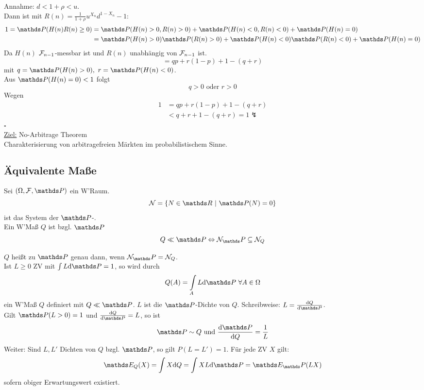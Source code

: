 Annahme: $d<1+\rho<u$.\\
Dann ist mit $R(n)=\frac{1}{1+\rho}u^{X_n}d^{1-X_n}-1$:
\begin{equation*}
\begin{aligned}
	1=\Pw(H(n)R(n)\ge 0)&=\Pw(H(n)>0,R(n)>0)+\Pw(H(n)<0,R(n)<0)+\Pw(H(n)=0)\\
	&=\Pw(H(n)>0)\Pw(R(n)>0)+\Pw(H(n)<0)\Pw(R(n)<0)+\Pw(H(n)=0)
\end{aligned}
\end{equation*}
Da $H(n)$ $\mathcal{F}_{n-1}$-messbar ist und $R(n)$ unabhängig von $\mathcal{F}_{n-1}$ ist.
\[
=qp+r(1-p)+1-(q+r)
\]
mit $q=\Pw(H(n)>0),~r=\Pw(H(n)<0)$.\\
Aus $\Pw(H(n)=0)<1$ folgt
\[
q>0 \text{ oder } r>0
\]
Wegen
\begin{equation*}
\begin{aligned}
	1&=qp+r(1-p)+1-(q+r)\\
	&<q+r+1-(q+r)=1\lightning
\end{aligned}
\end{equation*}
\hfill $\square$\\
\newpage
\uline{Ziel:} No-Arbitrage Theorem\\
Charakterisierung von arbitragefreien Märkten im probabilistischem Sinne.

\subsection{Äquivalente Maße}
\label{sub:eq_mas}
Sei $(\Omega,\F,\Pw)$ ein W'Raum.
\[
\mc{N}=\{N\in \R~|~\Pw(N)=0\}
\]
ist das System der $\Pw$-.\\
Ein W'Maß $Q$ ist  bzgl. $\Pw$
\[
Q\ll \Pw \Leftrightarrow \mc{N}_\Pw \subseteq \mc{N}_Q
\]

$Q$ heißt  zu $\Pw$ genau dann, wenn $\mc{N}_\Pw=\mc{N}_Q$.\\
Ist $L\ge 0$ ZV mit $\int L\dint \Pw=1$, so wird durch
\[
Q(A)=\int\limits_A L\dint \Pw~\forall A\in \Omega
\]
ein W'Maß $Q$ definiert mit $Q\ll \Pw$.
$L$ ist die $\Pw$-Dichte von $Q$.
Schreibweise: $L=\frac{\dint Q}{\dint \Pw}$.\\
Gilt $\Pw(L>0)=1$ und $\frac{\dint Q}{\dint \Pw}=L$, so ist
\[
\Pw \sim Q \text{ und } \frac{\dint \Pw}{\dint Q}=\frac{1}{L}
\]
Weiter: Sind $L,L'$ Dichten von $Q$ bzgl. $\Pw$, so gilt $P(L=L')=1$. Für jede ZV $X$ gilt:
\[
\E_Q(X)=\int X\dint Q=\int XL\dint\Pw=\E_\Pw(LX)
\]
sofern obiger Erwartungswert existiert.\\

